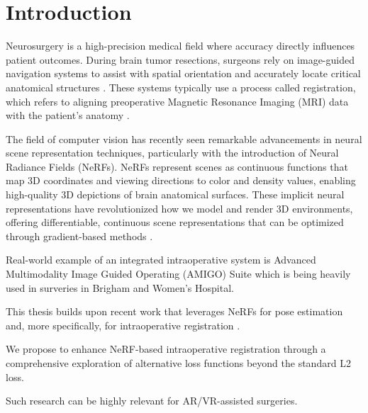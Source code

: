 
\chapter{Introduction}\label{chapter:introduction}

Neurosurgery is a high-precision medical field where accuracy directly influences patient outcomes. During brain tumor resections, surgeons rely on image-guided navigation systems to assist with spatial orientation and accurately locate critical anatomical structures \parencite{navab2015surgical}. These systems typically use a process called registration, which refers to aligning preoperative Magnetic Resonance Imaging (MRI) data with the patient's anatomy \parencite{Alam2017Medical}. 

The field of computer vision has recently seen remarkable advancements in neural scene representation techniques, particularly with the introduction of Neural Radiance Fields (NeRFs). NeRFs represent scenes as continuous functions that map 3D coordinates and viewing directions to color and density values, enabling high-quality 3D depictions of brain anatomical surfaces. These implicit neural representations have revolutionized how we model and render 3D environments, offering differentiable, continuous scene representations that can be optimized through gradient-based methods \parencite{mildenhall2020nerf}.

Real-world example of an integrated intraoperative system is Advanced Multimodality Image Guided Operating (AMIGO) Suite which is being heavily used in surveries in Brigham and Women's Hospital.

This thesis builds upon recent work that leverages NeRFs for pose estimation \parencite{yen2020inerf} and, more specifically, for intraoperative registration \parencite{fehrentz2024intraoperative}. 

We propose to enhance NeRF-based intraoperative registration through a comprehensive exploration of alternative loss functions beyond the standard L2 loss.

Such research can be highly relevant for AR/VR-assisted surgeries. \cite{Cho2020Enhancing}

